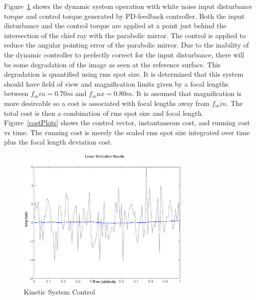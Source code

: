 \documentclass{aiaa-tc}
\begin{document}
Figure~\ref{KinSys} shows the dynamic system operation with white noise input disturbance torque and control torque generated by PD-feedback controller. Both the input disturbance and the control torque are applied at a point just behind the intersection of the chief ray with the parabolic mirror. The control is applied to reduce the angular pointing error of the parabolic mirror. Due to the inability of the dynamic controller to perfectly correct for the input disturbance, there will be some degradation of the image as seen at the reference surface. This degradation is quantified using rms spot size. It is determined that this system should have field of view and magnification limits given by a focal lengths between $f_min = 0.70 m$ and $f_max = 0.80 m$. It is assumed that magnification is more desireable so a cost is associated with focal lengths away from $f_min$. The total cost is then a combination of rms spot size and focal length. Figure~\ref{costPlots} shows the control vector, instantaneous cost, and running cost vs time. The running cost is merely the scaled rms spot size integrated over time plus the focal length deviation cost.

\begin{figure}[htb]	%
 \centering
 \includegraphics[width=0.75\textwidth]{Figures/DynamicSystem}
 \caption{Kinetic System Control}
 \label{KinSys}
\end{figure}
\end{document}
